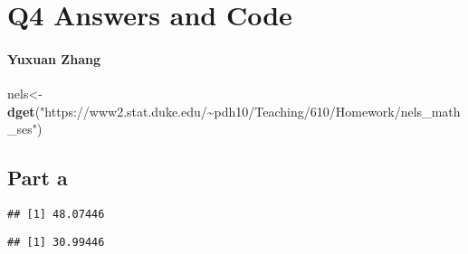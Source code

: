 \documentclass[
]{article}
\author{}
\date{\vspace{-2.5em}}
\newenvironment{Shaded}{\begin{snugshade}}{\end{snugshade}}
\newcommand{\AttributeTok}[1]{\textcolor[rgb]{0.13,0.29,0.53}{#1}}
\newcommand{\ConstantTok}[1]{\textcolor[rgb]{0.56,0.35,0.01}{#1}}
\newcommand{\FunctionTok}[1]{\textcolor[rgb]{0.13,0.29,0.53}{\textbf{#1}}}
\newcommand{\NormalTok}[1]{#1}
\newcommand{\OtherTok}[1]{\textcolor[rgb]{0.56,0.35,0.01}{#1}}
\newcommand{\SpecialCharTok}[1]{\textcolor[rgb]{0.81,0.36,0.00}{\textbf{#1}}}
\newcommand{\StringTok}[1]{\textcolor[rgb]{0.31,0.60,0.02}{#1}}
\begin{document}
\hypertarget{q4-answers-and-code}{%
\section{Q4 Answers and Code}\label{q4-answers-and-code}}

\hypertarget{yuxuan-zhang}{%
\paragraph{Yuxuan Zhang}\label{yuxuan-zhang}}

\begin{Shaded}
\begin{Highlighting}[]
\NormalTok{nels}\OtherTok{\textless{}{-}}\FunctionTok{dget}\NormalTok{(}\StringTok{"https://www2.stat.duke.edu/\textasciitilde{}pdh10/Teaching/610/Homework/nels\_math\_ses"}\NormalTok{) }
\end{Highlighting}
\end{Shaded}

\hypertarget{part-a}{%
\subsection{Part a}\label{part-a}}

\begin{Shaded}
\end{Shaded}

\begin{verbatim}
## [1] 48.07446
\end{verbatim}

\begin{Shaded}
\end{Shaded}

\begin{verbatim}
## [1] 30.99446
\end{verbatim}
\end{document}
